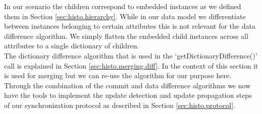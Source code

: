 In our scenario the children correspond to embedded instances as we defined them in Section \ref{sec:histo.hierarchy}.
While in our data model we differentiate between instances belonging to certain attributes this is not relevant for the data difference algorithm.
We simply flatten the embedded child instances across all attributes to a single dictionary of children.\\
The dictionary difference algorithm that is used in the `getDictionaryDifference()' call is explained in Section \ref{sec:histo.merging.diff}.
In the context of this section it is used for merging but we can re-use the algorithm for our purpose here.\\
Through the combination of the commit and data difference algorithms we now have the tools to implement the update detection and update propagation steps of our synchronization protocol as described in Section \ref{sec:histo.protocol}.
